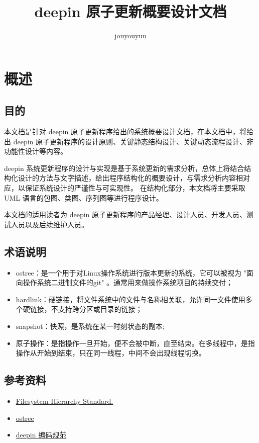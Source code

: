 \documentclass{utart}
\title{deepin 原子更新概要设计文档}
\author{jouyouyun}
\begin{document}
\utMakeTOC

\section{概述}
\subsection{目的}
本文档是针对 deepin 原子更新程序给出的系统概要设计文档，在本文档中，将给出 deepin 原子更新程序的设计原则、关键静态结构设计、关键动态流程设计、非功能性设计等内容。
\par
deepin 系统更新程序的设计与实现是基于系统更新的需求分析，总体上将结合结构化设计的方法与文字描述，给出程序结构化的概要设计，与需求分析内容相对应，以保证系统设计的严谨性与可实现性。
在结构化部分，本文档将主要采取 UML 语言的包图、类图、序列图等进行程序设计。
\par
本文档的适用读者为 deepin 原子更新程序的产品经理、设计人员、开发人员、测试人员以及后续维护人员。

\subsection{术语说明}
\begin{itemize}[leftmargin=4em]
\item ostree：是一个用于对Linux操作系统进行版本更新的系统，它可以被视为 "面向操作系统二进制文件的git" 。通常用来做操作系统项目的持续交付；
\item hardlink：硬链接，将文件系统中的文件与名称相关联，允许同一文件使用多个硬链接，不支持跨分区或目录的链接；
\item snapshot：快照，是系统在某一时刻状态的副本;
\item 原子操作：是指操作一旦开始，便不会被中断，直至结束。在多线程中，是指操作从开始到结束，只在同一线程，中间不会出现线程切换。
\end{itemize}

\subsection{参考资料}
\begin{itemize}[leftmargin=4em]
\item \href{https://refspecs.linuxfoundation.org/FHS\_3.0/fhs/index.html}{Filesystem Hierarchy Standard.}
\item \href{https://ostree.readthedocs.io/en/latest/}{ostree}
\item \href{https://github.com/linuxdeepin/deepin-styleguide}{deepin 编码规范}
\end{itemize}
\end{document}
